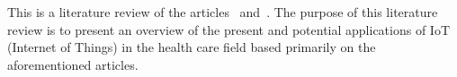 This is a literature review of the articles~\cite{Bui2011}
and~\cite{Islam2015}. The purpose of this literature review is to present an
overview of the present and potential applications of IoT (Internet of Things) in the
health care field based primarily on the aforementioned articles.

